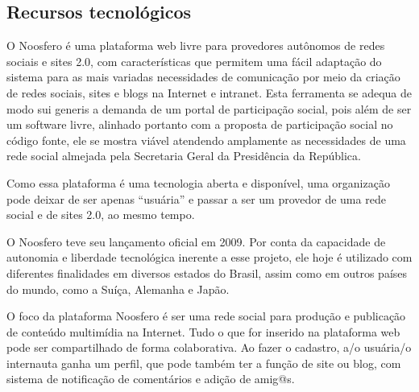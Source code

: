 \documentclass{article}
\begin{document}
%

\subsection{Recursos tecnológicos}

O Noosfero é uma plataforma web livre para provedores autônomos de redes
sociais e sites 2.0, com características que permitem uma fácil adaptação do
sistema para as mais variadas necessidades de comunicação por meio da criação
de redes sociais, sites e blogs na Internet e intranet. Esta ferramenta se
adequa de modo sui generis a demanda de um portal de participação social, pois
além de ser um software livre, alinhado portanto com  a proposta de
participação social no código fonte, ele se mostra viável atendendo amplamente
as necessidades de uma rede social almejada pela Secretaria Geral da
Presidência da República.

Como essa plataforma é uma tecnologia aberta e disponível, uma organização pode
deixar de ser apenas ``usuária'' e passar a ser um provedor de uma rede social e
de sites 2.0, ao mesmo tempo.

O Noosfero teve seu lançamento oficial em 2009. Por conta da capacidade de
autonomia e liberdade tecnológica inerente a esse projeto, ele hoje é utilizado
com diferentes finalidades em diversos estados do Brasil, assim como em outros
países do mundo, como a Suíça, Alemanha e Japão.

O foco da plataforma Noosfero é ser uma rede social para produção e publicação
de conteúdo multimídia na Internet. Tudo o que for inserido na plataforma web
pode ser compartilhado de forma colaborativa. Ao fazer o cadastro, a/o
usuária/o internauta ganha um perfil, que pode também ter a função de site ou
blog, com sistema de notificação de comentários e adição de amig@s.
\end{document}
